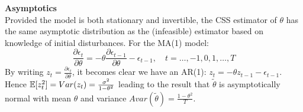 \documentclass[DIV=14,titlepage=false]{scrreprt}
\begin{document}
\textbf{Asymptotics}\\
Provided the model is both stationary and invertible, the CSS estimator of $\theta$ has the same asymptotic distribution as the (infeasible) estimator based on knowledge of initial disturbances. For the MA(1) model:
\[
   \frac{\partial \epsilon_t}{\partial \theta} = -\theta \frac{\partial \epsilon_{t-1}}{\partial \theta} - \epsilon_{t-1} , \quad t = \dots, -1, 0, 1, \dots, T
\]
By writing $z_t = \frac{\partial \epsilon_t}{\partial \theta}$, it becomes clear we have an AR(1): $z_t = -\theta z_{t-1} - \epsilon_{t-1}$. Hence $\mathbb{E} [z_t^2] = Var(z_t) = \frac{\sigma^2}{1-\theta^2}$ leading to the result that $\tilde \theta$ is asymptotically normal with mean $\theta$ and variance $Avar(\tilde \theta) = \frac{1-\theta^2}{T}$.
\end{document}
